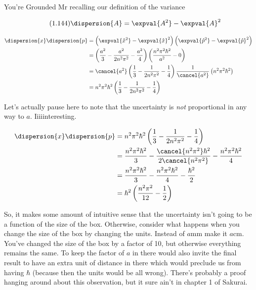 \begin{answer}
\begin{answerpart}{You're Grounded Mr}
    recalling our definition of the variance

    \begin{equation*}
      \tag{1.144}
      \dispersion{A} = \expval{A^2} - \expval{A}^2
    \end{equation*}

    \begin{equation}
      \begin{split}
        \dispersion{x}\dispersion{p}
        &=
        \left(\expval{\hat{x}^2} - \expval{\hat{x}}^2\right)
        \left(\expval{\hat{p}^2} - \expval{\hat{p}}^2\right)
        \\
        &=
        \left(\frac{a^2}{3} - \frac{a^2}{2n^2\pi^2} - \frac{a^2}{4}\right)
        \left(\frac{n^2\pi^2\hbar^2}{a^2} - 0\right)
        \\
        &=
        \cancel{a^2}
        \left(\frac{1}{3} - \frac{1}{2n^2\pi^2} - \frac{1}{4}\right)
        \frac{1}{\cancel{a^2}}
        \left(n^2\pi^2\hbar^2\right)
        \\
        &=
        n^2\pi^2\hbar^2
        \left(\frac{1}{3} - \frac{1}{2n^2\pi^2} - \frac{1}{4}\right)
        \\
      \end{split}
    \end{equation}

    Let's actually pause here to note that the uncertainty is
    \emph{not} proportional in any way to $a$.  Iiiiinteresting.

    \begin{equation}
      \begin{split}
        \dispersion{x}\dispersion{p}
        &=
        n^2\pi^2\hbar^2
        \left(\frac{1}{3} - \frac{1}{2n^2\pi^2} - \frac{1}{4}\right)
        \\
        &=
        \frac{n^2\pi^2\hbar^2}{3}
        - \frac{\cancel{n^2\pi^2}\hbar^2}{2\cancel{n^2\pi^2}}
        - \frac{n^2\pi^2\hbar^2}{4}
        \\
        &=
        \frac{n^2\pi^2\hbar^2}{3}
        - \frac{n^2\pi^2\hbar^2}{4}
        - \frac{\hbar^2}{2}
        \\
        &=
        \hbar^2
        \left(
        \frac{n^2\pi^2}{12}
        - \frac{1}{2}
        \right)
        \\
      \end{split}
    \end{equation}

    So, it makes some amount of intuitive sense that the uncertainty
    isn't going to be a function of the size of the box.  Otherwise,
    consider what happens when you change the size of the box by
    changing the units.  Instead of $a$mm make it $a$cm.  You've
    changed the size of the box by a factor of 10, but otherwise
    everything remains the same.  To keep the factor of $a$ in there
    would also invite the final result to have an extra unit of
    distance in there which would preclude us from having $\hbar$
    (because then the units would be all wrong).  There's probably a
    proof hanging around about this observation, but it sure ain't in
    chapter 1 of Sakurai.


\end{answerpart}
\end{answer}
